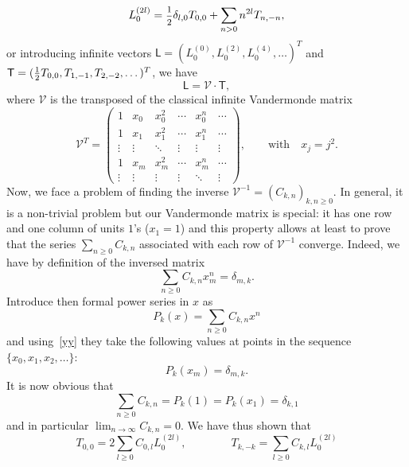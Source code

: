 \documentclass[11pt]{article}
\newcommand{\strt}{T}
\newcommand{\ffrac}[2]{\mbox{\footnotesize$\displaystyle\frac{#1}{#2}$}}
\newcommand{\half}{%
  \mathchoice{\ffrac{1}{2}}{\frac{1}{2}}{\frac{1}{2}}{\frac{1}{2}}}
\newcommand{\vand}{\mathscr{V}}
\newcommand{\vandT}{\mathscr{V}^{T}}
\newcommand{\Lv}{\mathsf{L}}
\newcommand{\Tv}{\mathsf{T}}
\theoremstyle{definition}
\begin{document}
\begin{equation}
L_0^{(2l)} = \half\delta_{l,0}\strt_{0,0} + \sum_{n>0} n^{2l}\strt_{n,-n},
\end{equation}
or introducing infinite vectors $\Lv=(L_0^{(0)},L_0^{(2)},L_0^{(4)},\dots)^T$ and $\Tv=(\half\strt_{0,0},\strt_{1,-1},\strt_{2,-2},\dots)^T$, we have
\begin{equation}
\Lv=\vand \cdot \Tv,
\end{equation}
where $\vand$ is the transposed of the
 classical infinite Vandermonde matrix
\begin{equation}
\vandT =
\begin{pmatrix}
1 & x_0 & x_0^2 & \cdots & x_0^n & \cdots\\
1 & x_1 & x_1^2 & \cdots &  x_1^n & \cdots\\
\vdots & \vdots & \ddots & \vdots & \vdots &\vdots\\
1 & x_m & x_m^2 & \cdots &  x_m^n & \cdots\\
\vdots & \vdots & \vdots & \vdots &\ddots &\vdots
\end{pmatrix},
\qquad \text{with}\quad x_j=j^2.
\end{equation}
Now, we face a problem of finding the
 inverse  $\vand^{-1}=(C_{k,n})_{k,n\geq0}$. In general, it is a non-trivial problem but our Vandermonde matrix is special: it has one row and one column of units $1$'s ($x_1=1$) and this property allows at least to prove that the series $\sum_{n\geq0}C_{k,n}$ associated with each row of $\vand^{-1}$ converge. Indeed, we have by definition of the inversed matrix
 \begin{equation}\label{yy}
 \sum_{n\geq0} C_{k,n} x_m^n  = \delta_{m,k}.
 \end{equation}
Introduce then formal power series in $x$ as
\begin{equation}\label{pow-ser}
P_k(x) = \sum_{n\geq0} C_{k,n} x^n
\end{equation}
and using~\eqref{yy} they take the following values at  points in the sequence $\{x_0,x_1,x_2,\ldots\}$:
\begin{equation}
P_k(x_m)=\delta_{m,k}.
\end{equation}
It is now obvious that
\begin{equation}
\sum_{n\geq0}C_{k,n} = P_k(1) = P_k(x_1) = \delta_{k,1}
\end{equation}
and in particular $\lim_{n\to\infty}C_{k,n}=0$.
We have thus shown that
\begin{equation}
\strt_{0,0} = 2\sum_{l\geq0}C_{0,l} L_0^{(2l)},\qquad\qquad
\strt_{k,-k} = \sum_{l\geq0}C_{k,l} L_0^{(2l)}
\end{equation}
\end{document}
